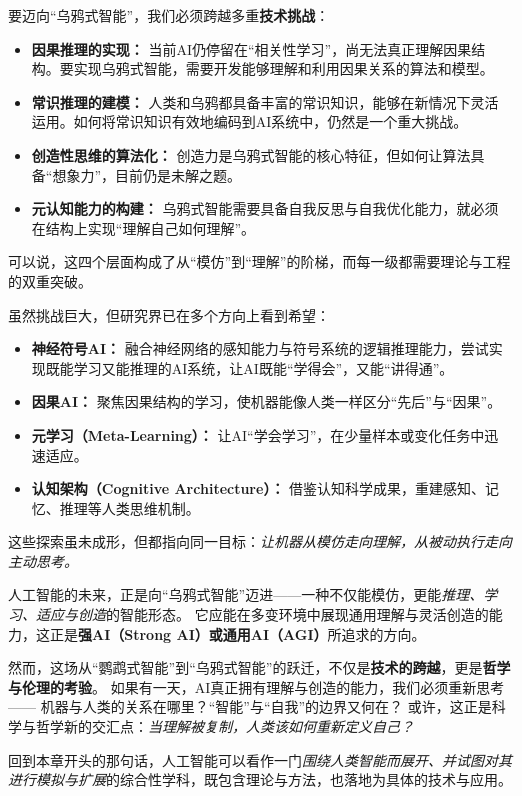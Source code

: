 要迈向“乌鸦式智能”，我们必须跨越多重\textbf{技术挑战}：  
\begin{itemize}
\item \textbf{因果推理的实现：} 当前AI仍停留在“相关性学习”，尚无法真正理解因果结构。要实现乌鸦式智能，需要开发能够理解和利用因果关系的算法和模型。  
\item \textbf{常识推理的建模：} 人类和乌鸦都具备丰富的常识知识，能够在新情况下灵活运用。如何将常识知识有效地编码到AI系统中，仍然是一个重大挑战。  
\item \textbf{创造性思维的算法化：} 创造力是乌鸦式智能的核心特征，但如何让算法具备“想象力”，目前仍是未解之题。  
\item \textbf{元认知能力的构建：} 乌鸦式智能需要具备自我反思与自我优化能力，就必须在结构上实现“理解自己如何理解”。  
\end{itemize}
可以说，这四个层面构成了从“模仿”到“理解”的阶梯，而每一级都需要理论与工程的双重突破。  

虽然挑战巨大，但研究界已在多个方向上看到希望：  
\begin{itemize}
\item \textbf{神经符号AI：} 融合神经网络的感知能力与符号系统的逻辑推理能力，尝试实现既能学习又能推理的AI系统，让AI既能“学得会”，又能“讲得通”。  
\item \textbf{因果AI：} 聚焦因果结构的学习，使机器能像人类一样区分“先后”与“因果”。  
\item \textbf{元学习（Meta-Learning）：} 让AI“学会学习”，在少量样本或变化任务中迅速适应。  
\item \textbf{认知架构（Cognitive Architecture）：} 借鉴认知科学成果，重建感知、记忆、推理等人类思维机制。  
\end{itemize}
这些探索虽未成形，但都指向同一目标：\emph{让机器从模仿走向理解，从被动执行走向主动思考。}  

人工智能的未来，正是向“乌鸦式智能”迈进——一种不仅能模仿，更能\emph{推理、学习、适应与创造}的智能形态。  
它应能在多变环境中展现通用理解与灵活创造的能力，这正是\textbf{强AI（Strong AI）或通用AI（AGI）}所追求的方向。  

然而，这场从“鹦鹉式智能”到“乌鸦式智能”的跃迁，不仅是\textbf{技术的跨越}，更是\textbf{哲学与伦理的考验}。  如果有一天，AI真正拥有理解与创造的能力，我们必须重新思考——  
机器与人类的关系在哪里？“智能”与“自我”的边界又何在？  
或许，这正是科学与哲学新的交汇点：\emph{当理解被复制，人类该如何重新定义自己？}  

回到本章开头的那句话，人工智能可以看作一门\emph{围绕人类智能而展开、并试图对其进行模拟与扩展}的综合性学科，既包含理论与方法，也落地为具体的技术与应用。

